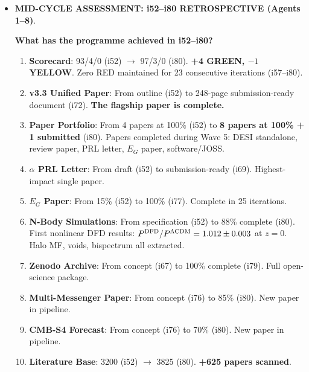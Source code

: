 \documentclass[11pt,a4paper]{article}
\begin{document}
\begin{itemize}
\item \textbf{MID-CYCLE ASSESSMENT: i52--i80 RETROSPECTIVE (Agents 1--8)}.

\textbf{What has the programme achieved in i52--i80?}

\begin{tcolorbox}[colback=green!5!white, colframe=dfdgreen, title=\textbf{i52--i80 Achievement Summary}]
\begin{enumerate}[nosep]
\item \textbf{Scorecard}: 93/4/0 (i52) $\to$ 97/3/0 (i80). \textbf{+4 GREEN, $-1$ YELLOW}. Zero RED maintained for 23 consecutive iterations (i57--i80).

\item \textbf{v3.3 Unified Paper}: From outline (i52) to 248-page submission-ready document (i72). \textbf{The flagship paper is complete.}

\item \textbf{Paper Portfolio}: From 4 papers at 100\% (i52) to \textbf{8 papers at 100\% + 1 submitted} (i80). Papers completed during Wave 5: DESI standalone, review paper, PRL letter, $E_G$ paper, software/JOSS.

\item \textbf{$\alpha$ PRL Letter}: From draft (i52) to submission-ready (i69). Highest-impact single paper.

\item \textbf{$E_G$ Paper}: From 15\% (i52) to 100\% (i77). Complete in 25 iterations.

\item \textbf{N-Body Simulations}: From specification (i52) to 88\% complete (i80). First nonlinear DFD results: $P^{\rm DFD}/P^{\Lambda{\rm CDM}} = 1.012 \pm 0.003$ at $z=0$. Halo MF, voids, bispectrum all extracted.

\item \textbf{Zenodo Archive}: From concept (i67) to 100\% complete (i79). Full open-science package.

\item \textbf{Multi-Messenger Paper}: From concept (i76) to 85\% (i80). New paper in pipeline.

\item \textbf{CMB-S4 Forecast}: From concept (i76) to 70\% (i80). New paper in pipeline.

\item \textbf{Literature Base}: 3200 (i52) $\to$ 3825 (i80). \textbf{+625 papers scanned}.


\end{enumerate}
\end{tcolorbox}
\end{itemize}
\end{document}
